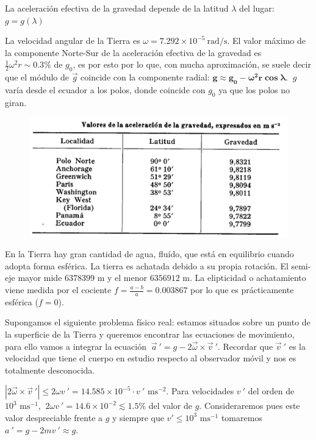 La aceleración efectiva de la gravedad depende de la latitud $\lambda$ del lugar: $g=g(\lambda)$

La velocidad angular de la Tierra es $\omega=7.292\times 10^{-5} \ \mathrm{rad/s}$. El valor máximo de la componente Norte-Sur de la aceleración efectiva de la gravedad es  $\frac 1 2 \omega^2 r \sim 0.3\%  \text{ de } g_0$, es por esto por lo que, con mucha aproximación, se suele decir que el módulo de $\vec g$ coincide con la componente radial: $\boldsymbol{ g\approx g_0-\omega^2r\cos \lambda }$. $\ g\ $ varía  desde el ecuador a los polos, donde coincide con $g_0$ ya que los polos no giran.

\begin{figure}[H]
	\centering
	\includegraphics[width=1\textwidth]{imagenes/imagenes11/T11IM07.png}
\end{figure}

En la Tierra hay gran cantidad de agua, fluído, que está en equilibrio cuando adopta forma esférica. La tierra es achatada debido a su propia rotación. El semi-eje mayor mide $6378399 \text{ m}$ y el menor $6356912\text{ m}$. La elipticidad o achatamiento viene medida por el cociente $f=\frac{a-b}{a}=0.003867$ por lo que es prácticamente esférica ($f=0$).

Supongamos el siguiente problema físico real: estamos situados sobre un punto de la superficie de la Tierra y queremos encontrar las ecuaciones de movimiento, para ello vamos a integrar la ecuación
$\ \vec a\ '=g-2\vec \omega \times \vec v\ '$. Recordar que $\vec v\ '$ es la velocidad que tiene el cuerpo en estudio respecto al observador móvil y nos es totalmente desconocida.

$|2\vec \omega \times \vec v\ '| \leqslant 2\omega v\ '=14.585\times 10^{-5}\cdot v\ ' \text{ ms}^{-2}$.  Para velocidades $v\ '$ del orden de $10^3 \text{ ms}^{-1}$, $\ 2\omega v\ ' = 14.6\times 10^{-2} \lesssim  1.5\%$ del valor de $g$. Consideraremos pues este valor despreciable frente a $g$ y siempre que $v ' \leq 10^3 \text{ ms}^{-1}$ tomaremos $a\ '= g - 2mv\ ' \approx g$.


